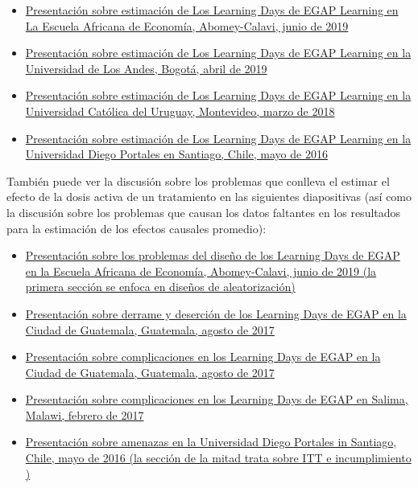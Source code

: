 \documentclass[12pt,spanish,]{book}
\begin{document}
\begin{itemize}
\item
  \href{https://egap.github.io/learningdays-resources/Slides/Examples/estimation-benin.pdf}{Presentación sobre estimación de Los Learning Days de EGAP Learning en La Escuela Africana de Economía, Abomey-Calavi, junio de 2019}
\item
  \href{https://egap.github.io/learningdays-resources/Slides/Examples/estimation-bogota.pdf}{Presentación sobre estimación de Los Learning Days de EGAP Learning en la Universidad de Los Andes, Bogotá, abril de 2019}
\item
  \href{https://egap.github.io/learningdays-resources/Slides/Examples/estimation-montevideo.pdf}{Presentación sobre estimación de Los Learning Days de EGAP Learning en la Universidad Católica del Uruguay, Montevideo, marzo de 2018}
\item
  \href{https://egap.github.io/learningdays-resources/Slides/Examples/estimation-santiago.pdf}{Presentación sobre estimación de Los Learning Days de EGAP Learning en la Universidad Diego Portales en Santiago, Chile, mayo de 2016}
\end{itemize}

También puede ver la discusión sobre los problemas que conlleva el estimar el efecto de la dosis activa de un tratamiento en las siguientes diapositivas (así como la discusión sobre los problemas que causan los datos faltantes en los resultados para la estimación de los efectos causales promedio):

\begin{itemize}
\item
  \href{https://egap.github.io/learningdays-resources/Slides/Examples/threats-benin.pdf}{Presentación sobre los problemas del diseño de los Learning Days de EGAP en la Escuela Africana de Economía, Abomey-Calavi, junio de 2019 (la primera sección se enfoca en diseños de aleatorización)}
\item
  \href{https://egap.github.io/learningdays-resources/Slides/Examples/spillovers_attrition-guatemala.pdf}{Presentación sobre derrame y deserción de los Learning Days de EGAP en la Ciudad de Guatemala, Guatemala, agosto de 2017}
\item
  \href{https://egap.github.io/learningdays-resources/Slides/Examples/threats-guatemala.pdf}{Presentación sobre complicaciones en los Learning Days de EGAP en la Ciudad de Guatemala, Guatemala, agosto de 2017}
\item
  \href{https://egap.github.io/learningdays-resources/Slides/Examples/complications-malawi.pdf}{Presentación sobre complicaciones en los Learning Days de EGAP en Salima, Malawi, febrero de 2017}
\item
  \href{https://egap.github.io/learningdays-resources/Slides/Examples/threats-santiago.pdf}{Presentación sobre amenazas en la Universidad Diego Portales in Santiago, Chile, mayo de 2016 (la sección de la mitad trata sobre ITT e incumplimiento )}
\end{itemize}
\end{document}
